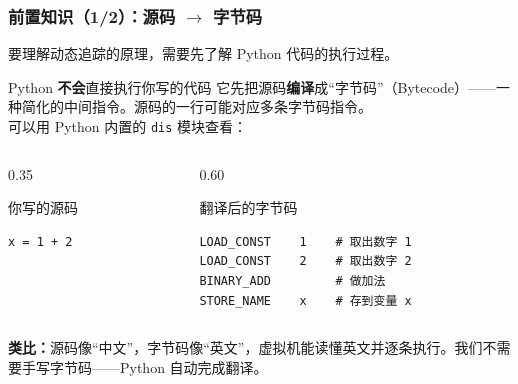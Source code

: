 \documentclass[presentation,aspectratio=169,fontset=none]{ctexbeamer}
\begin{document}
\begin{frame}[fragile]
\frametitle{前置知识（1/2）：源码 $\rightarrow$ 字节码}
{\footnotesize 要理解动态追踪的原理，需要先了解 Python 代码的执行过程。}

\vspace{0.1cm}
\begin{block}{\footnotesize Python \textbf{不会}直接执行你写的代码}
{\footnotesize 它先把源码\textbf{编译}成``字节码''（Bytecode）——一种简化的中间指令。源码的一行可能对应多条字节码指令。\\
可以用 Python 内置的 \texttt{dis} 模块查看：}
\end{block}

\vspace{0.1cm}
\begin{columns}[T]
\begin{column}{0.35\textwidth}
\begin{block}{\footnotesize 你写的源码}
{\footnotesize
\begin{verbatim}
x = 1 + 2
\end{verbatim}}
\end{block}
\end{column}
\begin{column}{0.60\textwidth}
\begin{block}{\footnotesize 翻译后的字节码}
{\footnotesize
\begin{verbatim}
LOAD_CONST    1    # 取出数字 1
LOAD_CONST    2    # 取出数字 2
BINARY_ADD         # 做加法
STORE_NAME    x    # 存到变量 x
\end{verbatim}}
\end{block}
\end{column}
\end{columns}

\vspace{0.1cm}
{\footnotesize \textbf{类比：}源码像``中文''，字节码像``英文''，虚拟机能读懂英文并逐条执行。我们不需要手写字节码——Python 自动完成翻译。}
\end{frame}

\end{document}

